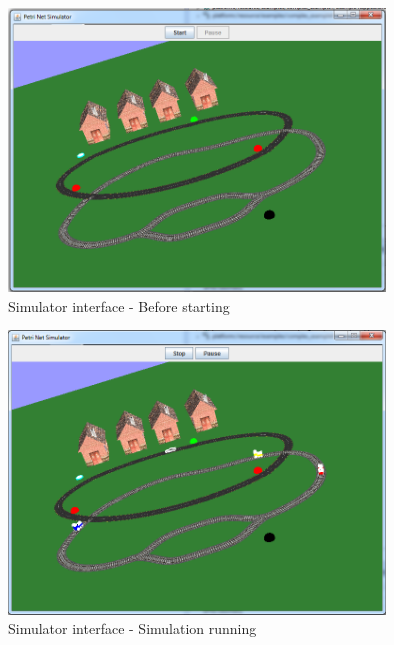 \begin{figure}[htp]
\begin{center}
  \includegraphics[width=10.0cm]{image/tutorial/Tutorial_19.png}
  \caption{Simulator interface - Before starting}
  \label{fig:tut19}
\end{center}
\end{figure}

\begin{figure}[htp]
\begin{center}
  \includegraphics[width=10.0cm]{image/tutorial/Tutorial_20.png}
  \caption{Simulator interface - Simulation running}
  \label{fig:tut20}
\end{center}
\end{figure}

